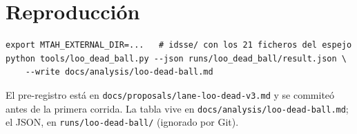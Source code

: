 \documentclass[11pt,a4paper]{article}
\begin{document}
\section{Reproducción}

\begin{verbatim}
export MTAH_EXTERNAL_DIR=...   # idsse/ con los 21 ficheros del espejo
python tools/loo_dead_ball.py --json runs/loo_dead_ball/result.json \
    --write docs/analysis/loo-dead-ball.md
\end{verbatim}

El pre-registro está en \texttt{docs/proposals/lane-loo-dead-v3.md} y se commiteó antes de la
primera corrida. La tabla vive en \texttt{docs/analysis/loo-dead-ball.md}; el JSON, en
\texttt{runs/loo-dead-ball/} (ignorado por Git).
\end{document}
